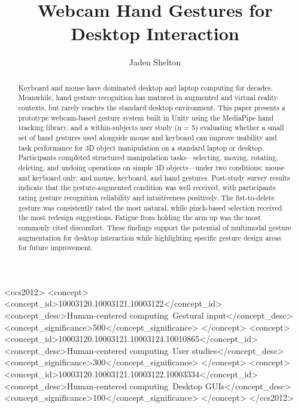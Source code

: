 \documentclass[manuscript]{acmart}
\begin{document}
\title{Webcam Hand Gestures for Desktop Interaction}

\author{Jaden Shelton}

\renewcommand{\shortauthors}{Shelton}

\begin{abstract}
Keyboard and mouse have dominated desktop and laptop computing for decades. Meanwhile, hand gesture recognition has matured in augmented and virtual reality contexts, but rarely reaches the standard desktop environment. This paper presents a prototype webcam-based gesture system built in Unity using the MediaPipe hand tracking library, and a within-subjects user study (n = 5) evaluating whether a small set of hand gestures used alongside mouse and keyboard can improve usability and task performance for 3D object manipulation on a standard laptop or desktop. Participants completed structured manipulation tasks—selecting, moving, rotating, deleting, and undoing operations on simple 3D objects—under two conditions: mouse and keyboard only, and mouse, keyboard, and hand gestures. Post-study survey results indicate that the gesture-augmented condition was well received, with participants rating gesture recognition reliability and intuitiveness positively. The fist-to-delete gesture was consistently rated the most natural, while pinch-based selection received the most redesign suggestions. Fatigue from holding the arm up was the most commonly cited discomfort. These findings support the potential of multimodal gesture augmentation for desktop interaction while highlighting specific gesture design areas for future improvement.
\end{abstract}

\begin{CCSXML}
<ccs2012>
 <concept>
  <concept_id>10003120.10003121.10003122</concept_id>
  <concept_desc>Human-centered computing~Gestural input</concept_desc>
  <concept_significance>500</concept_significance>
 </concept>
 <concept>
  <concept_id>10003120.10003121.10003124.10010865</concept_id>
  <concept_desc>Human-centered computing~User studies</concept_desc>
  <concept_significance>300</concept_significance>
 </concept>
 <concept>
  <concept_id>10003120.10003121.10003122.10003334</concept_id>
  <concept_desc>Human-centered computing~Desktop GUIs</concept_desc>
  <concept_significance>100</concept_significance>
 </concept>
</ccs2012>
\end{CCSXML}
\end{document}
